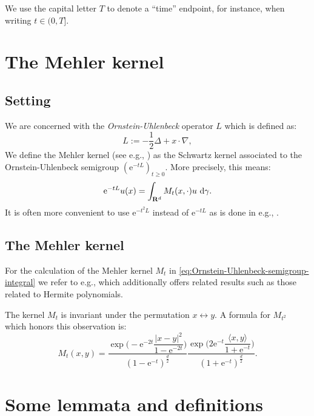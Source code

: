 \documentclass[a4paper,oneside,10pt]{amsproc}
\theoremstyle{plain}
\theoremstyle{remark}
\theoremstyle{definition}
\newcommand{\D}{\,\textup{d}}
\newcommand{\la}{\langle}
\newcommand{\ra}{\rangle}
\renewcommand{\geq}{\geqslant}
\newcommand{\R}{\mathbf R}
\newcommand{\e}{\mathrm{e}} %
\renewcommand{\geq}{\geqslant}%
\begin{document}
We use the capital letter $T$ to denote a ``time'' endpoint, for
instance, when writing $t \in (0, T]$.

%
%
%

\section{The Mehler kernel}
\subsection{Setting}
We are concerned with the \emph{Ornstein-Uhlenbeck} operator $L$ which
is defined as:
\begin{equation}
  \label{eq:Ornstein-Uhlenbeck-operator}
  L := -\frac12 \Delta + x \cdot \nabla,
\end{equation}
We define the Mehler kernel (see e.g., \textcite{Sjogren1997}) as the
Schwartz kernel associated to the Ornstein-Uhlenbeck semigroup
$(\e^{-tL})_{t \geq 0}$. More precisely, this means:
\begin{equation}
  \label{eq:Ornstein-Uhlenbeck-semigroup-integral}
  \e^{-tL} u(x) = \int_{\R^d} M_t(x, \cdot) u \, \D\gamma.
\end{equation}
It is often more convenient to use $\e^{-t^2 L}$ instead of $\e^{-tL}$
as is done in e.g., \textcite{Portal2012}.

\subsection{The Mehler kernel}
For the calculation of the Mehler kernel $M_t$ in
\eqref{eq:Ornstein-Uhlenbeck-semigroup-integral} we refer to e.g.,
\textcite{Sjogren1997} which additionally offers related results such
as those related to Hermite polynomials.

The kernel $M_t$ is invariant under the permutation $x
\leftrightarrow y$. A formula for $M_{t^2}$ which honors this
observation is:
\begin{equation}
  \label{eq:Mehler-kernel}
  M_t(x, y) = \frac{\exp\biggl(-\e^{-2t} \dfrac{|x - y|^2}{1
      - \e^{-2 t}}  \biggr)}{(1 - \e^{-t})^{\frac{d}2}}
  \frac{\exp\biggl(2\e^{-t} \dfrac{\la x, y \ra}{1 + \e^{-t}}
    \biggr)}{(1 + \e^{-t})^{\frac{d}2}}.
\end{equation}

\section{Some lemmata and definitions}
\end{document}
